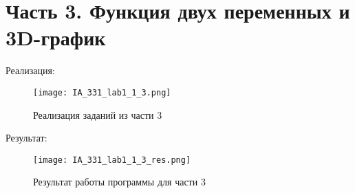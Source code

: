 \chapter{Часть 3. Функция двух переменных и 3D-график}
\label{ch:chap3}

Реализация:\\

\begin{figure}[ht]
    \centering
    \texttt{[image: IA\_331\_lab1\_1\_3.png]}
    \caption{Реализация заданий из части 3}
    \label{fig:open_audio}
\end{figure}

Результат:\\

\begin{figure}[ht]
    \centering
    \texttt{[image: IA\_331\_lab1\_1\_3\_res.png]}
    \caption{Результат работы программы для части 3}
    \label{fig:open_audio}
\end{figure}

\endinput